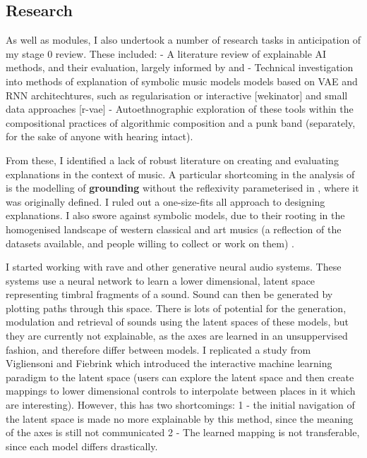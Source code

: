 \documentclass[../main.tex]{subfiles}
\begin{document}
\subsection{Research}
As well as modules, I also undertook a number of research tasks in anticipation of my stage 0 review. These included:
- A literature review of explainable AI methods, and their evaluation, largely informed by \cite{bryan-kinns_exploring_2021} and \cite{a.SystematicReviewExplainable2023}
- Technical investigation into methods of explanation of symbolic music models models based on VAE and RNN architechtures, such as regularisation \cite{pati_attribute-based_2020} or interactive [wekinator] and small data approaches [r-vae]
- Autoethnographic exploration of these tools within the compositional practices of algorithmic composition and a punk band (separately, for the sake of anyone with hearing intact).

From these, I identified a lack of robust literature on creating and evaluating explanations in the context of music. A particular shortcoming in the analysis of \cite{bryan-kinns_exploring_2021} is the modelling of \textbf{grounding} without the reflexivity parameterised in \cite{clark_grounding_1991}, where it was originally defined. I ruled out a one-size-fits all approach to designing explanations. I also swore against symbolic models, due to their rooting in the homogenised landscape of western classical and art musics (a reflection of the datasets available, and people willing to collect or work on them) \cite{gioti_artificial_2021}.

I started working with rave \cite{caillon_rave_2021} and other generative neural audio systems. These systems use a neural network to learn a lower dimensional, latent space representing timbral fragments of a sound. Sound can then be generated by plotting paths through this space. There is lots of potential for the generation, modulation and retrieval of sounds using the latent spaces of these models, but they are currently not explainable, as the axes are learned in an unsuppervised fashion, and therefore differ between models. I replicated a study from Vigliensoni and Fiebrink \cite{vigliensoni_interacting_2023} which introduced the interactive machine learning paradigm to the latent space (users can explore the latent space and then create mappings to lower dimensional controls to interpolate between places in it which are interesting). However, this has two shortcomings: 1 - the initial navigation of the latent space is made no more explainable by this method, since the meaning of the axes is still not communicated
2 - The learned mapping is not transferable, since each model differs drastically.
\end{document}
